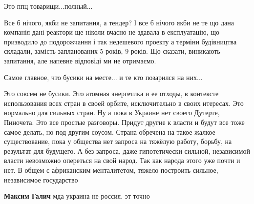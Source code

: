 \begin{itemize}
Это ппц товарищи...полный...

 

Все б нічого, якби не запитання, а тендер? І все б нічого якби не те що дана
компанія дані реактори ще ніколи вчасно не здавала в експлуатацію, що
призводило до подорожчання і так недешевого проекту а терміни будівництва
складали, замість запланованих 5 років, 9 років. Що сказати, виникають
запитання, але напевне відповіді ми не отримаємо.


 
Самое главное, что бусики на месте... и те кто позарился на них...


Это совсем не бусики. Это атомная энергетика и ее отходы, в контексте
использования всех стран в своей орбите, исключительно в своих итересах. Это
нормально для сильных стран. Ну а пока в Украине нет своего Дутерте, Пиночета.
Это все простые разговоры. Придут другие к власти и будут все тоже самое
делать, но под другим соусом. Страна обречена на такое жалкое существование,
пока у общества нет запроса на тяжёлую работу, борьбу, на результат для
будущего. А без запроса, даже гипотетически сильной, независимой власти
невозможно опереться на свой народ. Так как народа этого уже почти и нет. В
общем с африканским менталитетом, тяжело построить сильное, независимое
государство

\begin{itemize}
 
\textbf{Максим Галич} мда украина не россия. эт точно

 

\end{itemize}
\end{itemize}

